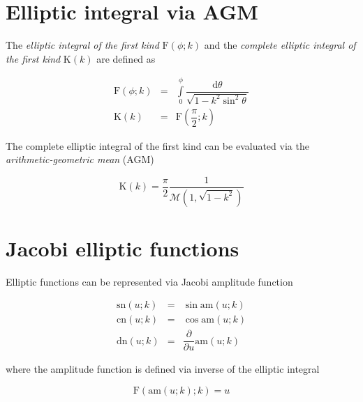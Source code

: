 \documentclass{article}
\begin{document}
\section{Elliptic integral via AGM}

The \textit{elliptic integral of the first kind} $\mathrm{F}(\phi;k)$ and the \textit{complete elliptic integral of the first kind} $\mathrm{K}(k)$ are defined as

\begin{eqnarray}
\mathrm{F}(\phi;k) & = & \int \limits_{0}^{\phi} \dfrac{\mathrm{d} \theta}{\sqrt{1 - k^2 \sin^2 \theta}} \\
\mathrm{K}(k) & = & \mathrm{F}\left( \dfrac{\pi}{2}; k \right)
\end{eqnarray}

The complete elliptic integral of the first kind can be evaluated via the \textit{arithmetic-geometric mean} (AGM) 

\begin{equation}
\mathrm{K}(k) = \dfrac{\pi}{2} \dfrac{1}{\mathcal{M}\left( 1, \sqrt{1 - k^2} \right)}
\end{equation}

\section{Jacobi elliptic functions}

Elliptic functions can be represented via Jacobi amplitude function

\begin{eqnarray}
\mathrm{sn}(u;k) & = & \sin \mathrm{am} (u;k) \\
\mathrm{cn}(u;k) & = & \cos \mathrm{am} (u;k) \\
\mathrm{dn}(u;k) & = & \dfrac{\partial}{\partial u} \mathrm{am} (u;k)
\end{eqnarray}

where the amplitude function is defined via inverse of the elliptic integral

\begin{equation}
\mathrm{F}(\mathrm{am}(u; k); k) = u
\end{equation}
\end{document}
